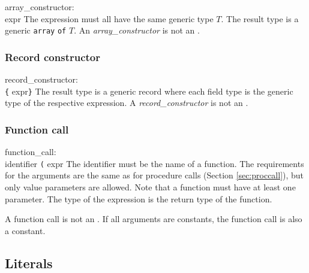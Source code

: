 \grammarstart
array\_constructor: \\
      \>{\tt{}[} expr\LIST {\tt{}]}
\grammarend
The expression must all have the same generic type $T$. The result type
is a generic {\tt{}array} {\tt{}of} $T$. An {\it{}array\_constructor} is not
an \lvalue.

\subsubsection{Record constructor}\label{sec:recordconstruct}

\grammarstart
record\_constructor: \\
      \>\verb|{| expr\LIST \verb|}|
\grammarend
The result type is a generic record where each field type is the
generic type of the respective expression.
A {\it{}record\_constructor} is not an \lvalue.


\subsubsection{Function call}\label{sec:funccall}

\grammarstart
function\_call: \\
      \>identifier {\tt{}(} expr\LIST {\tt{})}
\grammarend
The identifier must be the name of a function. The requirements for the
arguments are the same as for procedure calls (Section \ref{sec:proccall}),
but only value parameters are allowed. Note that a function must have
at least one parameter. The type of the expression is the return type
of the function.

A function call is not an \lvalue. If all arguments are constants, the
function call is also a constant.

\subsection{Literals}\label{sec:literal}

